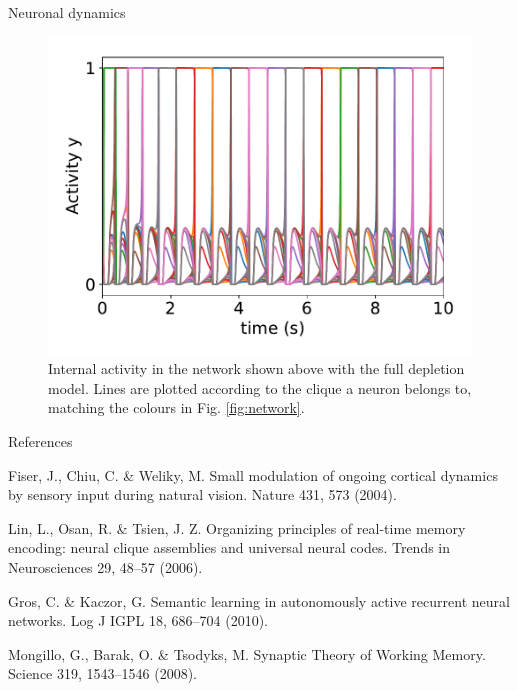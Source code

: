 \documentclass[final,hyperref={pdfpagelabels=false}]{beamer}
\begin{document}
\begin{frame}
\begin{columns}
\begin{column}{.30\textwidth}
\begin{minipage}[T]{.95\textwidth}
{\begin{block}{Neuronal dynamics}
				\begin{figure}
					\includegraphics[width=.8\linewidth]{double_activity}
					\caption{Internal activity in the network shown above with the full depletion model. Lines are plotted according to the clique a neuron belongs to, matching the colours in Fig. \ref{fig:network}.}
					\label{fig:activity}
				\end{figure}
		

			
			\end{block}
			\vfil
			\begin{refblock}{References}

					\begin{thebibliography}{1}

						Fiser, J., Chiu, C. \& Weliky, M. Small modulation of ongoing cortical dynamics by sensory input during natural vision. Nature 431, 573 (2004).
						
						
						 Lin, L., Osan, R. \& Tsien, J. Z. Organizing principles of real-time memory encoding: neural clique assemblies and universal neural codes. Trends in Neurosciences 29, 48–57 (2006).
						
						Gros, C. \& Kaczor, G. Semantic learning in autonomously active recurrent neural networks. Log J IGPL 18, 686–704 (2010).
						
						Mongillo, G., Barak, O. \& Tsodyks, M. Synaptic Theory of Working Memory. Science 319, 1543–1546 (2008).

					\end{thebibliography}

			\end{refblock}

}
\end{minipage}
\end{column}
\end{columns}
\end{frame}
\end{document}
